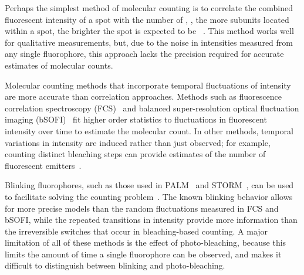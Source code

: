 %
%


%
Perhaps the simplest method of molecular counting is to correlate the combined
fluorescent intensity of a spot with the number of \smallobjects, \ie, the more subunits 
located within a spot, the brighter the spot is expected to be ~\citep{schmied_2012,
tolar_2005}.
  This method works well for qualitative measurements, but, due to the noise in
  intensities measured from any single fluorophore, this approach lacks the precision 
  required for accurate estimates of molecular counts. 

%
Molecular counting methods that incorporate temporal fluctuations of intensity
are more accurate than correlation approaches.
  Methods such as fluorescence correlation spectroscopy
  (FCS)~\citep{otsuka_2023,wachsmuth_2015,politi_2018} and balanced
  super-resolution optical fluctuation imaging
  (bSOFI)~\citep{geissbuehler_2012} fit higher order statistics to fluctuations
  in fluorescent intensity over time to estimate the molecular count.
  In other methods, temporal variations in intensity are induced rather than
  just observed; for example, counting distinct bleaching
  steps can provide estimates of the number of fluorescent
  emitters~\citep{ulbrich_2007,jain_2011,hummert_2021}.

%
Blinking fluorophores, such as those used in
PALM~\citep{sengupta_pcPALM_2011,lee_counting_2012} and
STORM~\citep{patel_blinking_2021}, can be used to facilitate solving the counting
problem~\citep{rollins_stochastic_2015,nino_2017}.
  The known blinking behavior allows for more precise models than the random
  fluctuations measured in FCS and bSOFI, while the repeated transitions in
  intensity provide more information than the irreversible switches that occur 
  in bleaching-based counting.
  A major limitation of all of these methods is the effect of photo-bleaching, because this
  limits the amount of time a single fluorophore can be observed, and makes it
  difficult to distinguish between blinking and photo-bleaching.

